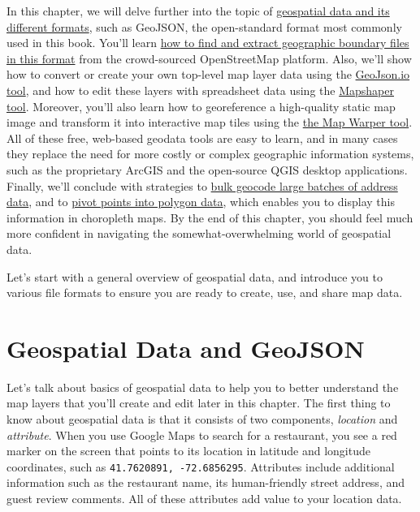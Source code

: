 \documentclass[
  english,
]{book}
\begin{document}
In this chapter, we will delve further into the topic of \href{geojson.html}{geospatial data and its different formats}, such as GeoJSON, the open-standard format most commonly used in this book. You'll learn \href{find-geojson.html}{how to find and extract geographic boundary files in this format} from the crowd-sourced OpenStreetMap platform. Also, we'll show how to convert or create your own top-level map layer data using the \href{geojsonio.html}{GeoJson.io tool}, and how to edit these layers with spreadsheet data using the \href{mapshaper.html}{Mapshaper tool}. Moreover, you'll also learn how to georeference a high-quality static map image and transform it into interactive map tiles using the \href{mapwarper.html}{the Map Warper tool}. All of these free, web-based geodata tools are easy to learn, and in many cases they replace the need for more costly or complex geographic information systems, such as the proprietary ArcGIS and the open-source QGIS desktop applications. Finally, we'll conclude with strategies to \href{bulk-geocode.html}{bulk geocode large batches of address data}, and to \href{pivot-point-to-polygon.html}{pivot points into polygon data}, which enables you to display this information in choropleth maps. By the end of this chapter, you should feel much more confident in navigating the somewhat-overwhelming world of geospatial data.

Let's start with a general overview of geospatial data, and introduce you to various file formats to ensure you are ready to create, use, and share map data.

\hypertarget{geojson}{%
\section*{Geospatial Data and GeoJSON}\label{geojson}}

Let's talk about basics of geospatial data to help you to better understand the map layers that you'll create and edit later in this chapter. The first thing to know about geospatial data is that it consists of two components, \emph{location} and \emph{attribute}.
When you use Google Maps to search for a restaurant, you see a red marker on the screen that points to its location in latitude and longitude coordinates, such as \texttt{41.7620891,\ -72.6856295}. Attributes include additional information such as the restaurant name, its human-friendly street address, and guest review comments. All of these attributes add value to your location data.
\end{document}
